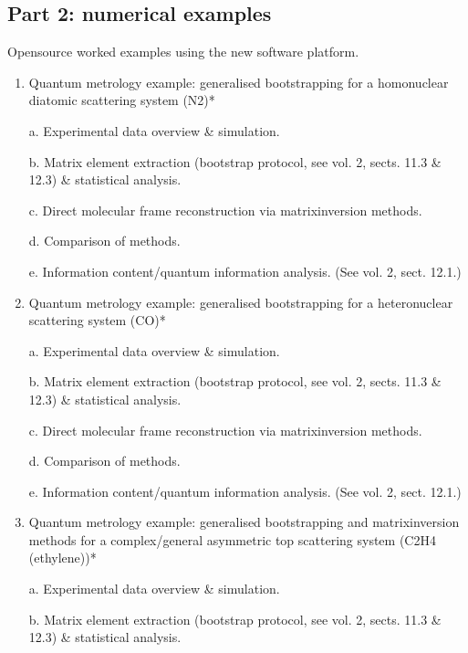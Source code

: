 \documentclass[letterpaper,table,10pt,english]{jupyterBook}
\begin{document}
\subsection{Part 2: numerical examples}
\label{\detokenize{frontmatter/overview_270122:part-2-numerical-examples}}
\sphinxAtStartPar
Open\sphinxhyphen{}source worked examples using the new software platform.
\begin{enumerate}
%
\item {} 
\sphinxAtStartPar
Quantum metrology example: generalised bootstrapping for a homonuclear diatomic scattering system (N2)*

\sphinxAtStartPar
a.  Experimental data overview \& simulation.

\sphinxAtStartPar
b.  Matrix element extraction (bootstrap protocol, see vol. 2, sects. 11.3 \& 12.3) \& statistical analysis.

\sphinxAtStartPar
c.  Direct molecular frame reconstruction via matrix\sphinxhyphen{}inversion methods.

\sphinxAtStartPar
d.  Comparison of methods.

\sphinxAtStartPar
e.  Information content/quantum information analysis. (See vol. 2, sect. 12.1.)

\item {} 
\sphinxAtStartPar
Quantum metrology example: generalised bootstrapping for a heteronuclear scattering system (CO)*

\sphinxAtStartPar
a.  Experimental data overview \& simulation.

\sphinxAtStartPar
b.  Matrix element extraction (bootstrap protocol, see vol. 2, sects. 11.3 \& 12.3) \& statistical analysis.

\sphinxAtStartPar
c.  Direct molecular frame reconstruction via matrix\sphinxhyphen{}inversion methods.

\sphinxAtStartPar
d.  Comparison of methods.

\sphinxAtStartPar
e.  Information content/quantum information analysis. (See vol. 2,
sect. 12.1.)

\item {} 
\sphinxAtStartPar
Quantum metrology example: generalised bootstrapping and
matrix\sphinxhyphen{}inversion methods for a complex/general asymmetric top
scattering system (C2H4 (ethylene))*

\sphinxAtStartPar
a.  Experimental data overview \& simulation.

\sphinxAtStartPar
b.  Matrix element extraction (bootstrap protocol, see vol. 2,
sects. 11.3 \& 12.3) \& statistical analysis.


\end{enumerate}
\end{document}
